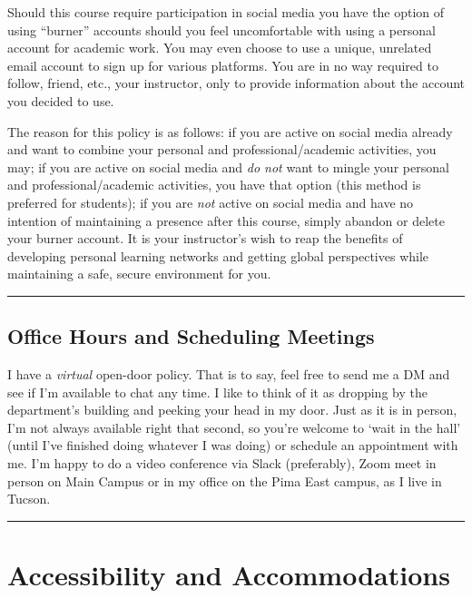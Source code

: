 \documentclass[]{article}
\begin{document}
Should this course require participation in social media you have the
option of using ``burner'' accounts should you feel uncomfortable with
using a personal account for academic work. You may even choose to use a
unique, unrelated email account to sign up for various platforms. You
are in no way required to follow, friend, etc., your instructor, only to
provide information about the account you decided to use.

The reason for this policy is as follows: if you are active on social
media already and want to combine your personal and
professional/academic activities, you may; if you are active on social
media and \emph{do not} want to mingle your personal and
professional/academic activities, you have that option (this method is
preferred for students); if you are \emph{not} active on social media
and have no intention of maintaining a presence after this course,
simply abandon or delete your burner account. It is your instructor's
wish to reap the benefits of developing personal learning networks and
getting global perspectives while maintaining a safe, secure environment
for you.

\begin{center}\rule{0.5\linewidth}{\linethickness}\end{center}

\hypertarget{office-hours-and-scheduling-meetings}{%
\subsection{Office Hours and Scheduling
Meetings}\label{office-hours-and-scheduling-meetings}}

I have a \emph{virtual} open-door policy. That is to say, feel free to
send me a DM and see if I'm available to chat any time. I like to think
of it as dropping by the department's building and peeking your head in
my door. Just as it is in person, I'm not always available right that
second, so you're welcome to `wait in the hall' (until I've finished
doing whatever I was doing) or schedule an appointment with me. I'm
happy to do a video conference via Slack (preferably), Zoom meet in
person on Main Campus or in my office on the Pima East campus, as I live
in Tucson.

\begin{center}\rule{0.5\linewidth}{\linethickness}\end{center}

\hypertarget{accessibility-and-accommodations}{%
\section{Accessibility and
Accommodations}\label{accessibility-and-accommodations}}
\end{document}
